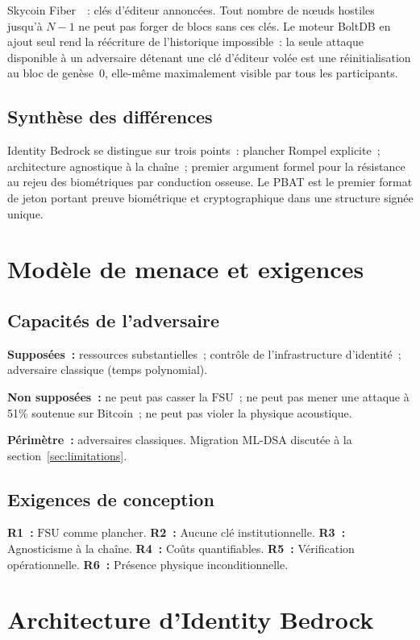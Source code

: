 \documentclass[11pt,a4paper]{article}
\theoremstyle{definition}
\newcommand{\OWF}{\mathrm{FSU}}
\newcommand{\PBAT}{\textsf{PBAT}}
\newcommand{\BD}{\textsf{Identity Bedrock}}
\begin{document}
Skycoin Fiber~\cite{Skycoin}~: clés d'éditeur annoncées. Tout nombre
de n\oe{}uds hostiles jusqu'à $N-1$ ne peut pas forger de blocs sans
ces clés. Le moteur BoltDB en ajout seul rend la réécriture de l'historique impossible~: la seule attaque disponible à un adversaire détenant une clé d'éditeur volée est une réinitialisation au bloc de genèse~0, elle-même maximalement visible par tous les participants.

\subsection{Synthèse des différences}

\BD{} se distingue sur trois points~: plancher Rompel explicite~;
architecture agnostique à la chaîne~; premier argument formel pour
la résistance au rejeu des biométriques par conduction osseuse. Le
\PBAT{} est le premier format de jeton portant preuve biométrique et
cryptographique dans une structure signée unique.

\section{Modèle de menace et exigences}
\label{sec:threat}

\subsection{Capacités de l'adversaire}

\textbf{Supposées~:} ressources substantielles~; contrôle de
l'infrastructure d'identité~; adversaire classique (temps polynomial).

\textbf{Non supposées~:} ne peut pas casser la $\OWF$~; ne peut pas
mener une attaque à 51\% soutenue sur Bitcoin~; ne peut pas violer
la physique acoustique.

\textbf{Périmètre~:} adversaires classiques. Migration ML-DSA
discutée à la section~\ref{sec:limitations}.

\subsection{Exigences de conception}

\textbf{R1~:} $\OWF$ comme plancher. \textbf{R2~:} Aucune clé
institutionnelle. \textbf{R3~:} Agnosticisme à la chaîne.
\textbf{R4~:} Coûts quantifiables. \textbf{R5~:} Vérification
opérationnelle. \textbf{R6~:} Présence physique inconditionnelle.

\section{Architecture d'Identity Bedrock}
\label{sec:architecture}
\end{document}
